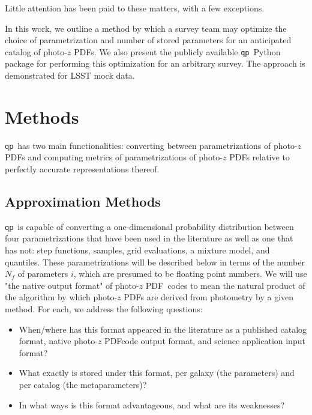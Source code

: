 \documentclass[\docopts]{\docclass}
\newcommand{\qp}{\texttt{qp}}
\newcommand{\pz}{photo-$z$ PDF}
\begin{document}
Little attention has been paid to these matters, with a few exceptions.  
\citep{carrasco_kind_sparse_2014}

In this work, we outline a method by which a survey team may optimize the 
choice of parametrization and number of stored parameters for an anticipated 
catalog of \pz s.  We also present the publicly available \qp\ Python package 
for performing this optimization for an arbitrary survey.  The approach is 
demonstrated for LSST mock data.








\section{Methods}
\label{sec:methods}



\qp\ has two main functionalities: converting between parametrizations of \pz s 
and computing metrics of parametrizations of \pz s relative to perfectly 
accurate representations thereof.

\subsection{Approximation Methods}
\label{sec:approx}


\qp\ is capable of converting a one-dimensional probability distribution 
between four parametrizations that have been used in the literature as well as 
one that has not: step functions, samples, grid evaluations, a mixture model, 
and quantiles.  These parametrizations will be described below in terms of the 
number $N_{f}$ of parameters $i$, which are presumed to be floating point 
numbers.  We will use "the native output format" of \pz\ codes to mean the 
natural product of the algorithm by which \pz s are derived from photometry by 
a given method.  For each, we address the following questions:

\begin{itemize}
  \item When/where has this format appeared in the literature as a published 
catalog format, native \pz code output format, and science application input 
format?
  \item What exactly is stored under this format, per galaxy (the parameters) 
and per catalog (the metaparameters)?
  \item In what ways is this format advantageous, and what are its weaknesses?
\end{itemize}
\end{document}
